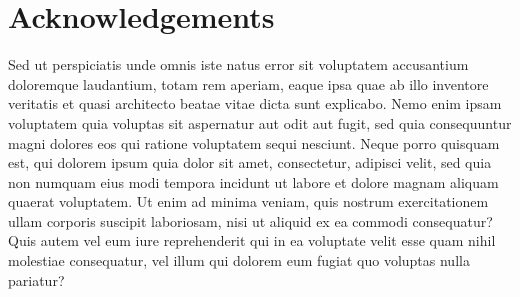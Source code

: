 \chapter*{Acknowledgements}
\label{chapter:acknowledgements}
    Sed ut perspiciatis unde omnis iste natus error sit voluptatem accusantium doloremque
    laudantium, totam rem aperiam, eaque ipsa quae ab illo inventore veritatis et quasi
    architecto beatae vitae dicta sunt explicabo. Nemo enim ipsam voluptatem quia voluptas
    sit aspernatur aut odit aut fugit, sed quia consequuntur magni dolores eos qui ratione
    voluptatem sequi nesciunt. Neque porro quisquam est, qui dolorem ipsum quia dolor sit
    amet, consectetur, adipisci velit, sed quia non numquam eius modi tempora incidunt ut
    labore et dolore magnam aliquam quaerat voluptatem. Ut enim ad minima veniam, quis
    nostrum exercitationem ullam corporis suscipit laboriosam, nisi ut aliquid ex ea commodi
    consequatur? Quis autem vel eum iure reprehenderit qui in ea voluptate velit esse quam nihil
    molestiae consequatur, vel illum qui dolorem eum fugiat quo voluptas nulla pariatur?
